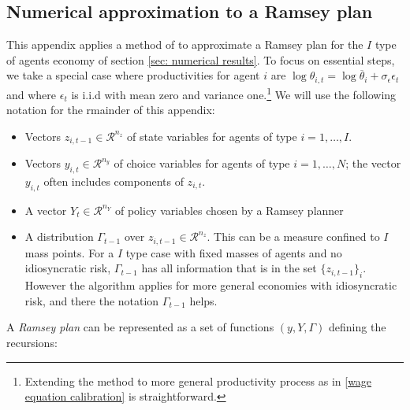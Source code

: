 \documentclass[thmsb,11pt]{article}
\begin{document}
\subsection{Numerical approximation to a Ramsey plan}\label{appndx: numerical appendix}
This appendix applies a method of \cite{Evans2014} to approximate a Ramsey plan for the $I$ type of agents economy of section \ref{sec: numerical results}. To focus on essential steps, we take a special case where productivities
for agent $i$ are $\log \theta_{i,t}=\log \overline{\theta}_i+\sigma_{\epsilon} \epsilon_t$ and where $\epsilon_t$ is i.i.d with mean zero and variance one.\footnote{Extending the method to more general productivity process as in \eqref{wage equation calibration} is straightforward.}
We will use the following notation for the rmainder of this appendix:

\begin{itemize}

\item Vectors $z_{i,{t-1}} \in \mathcal{R}^{n_z}$ of state variables for agents of type  $i =1, \ldots, I$.
\item Vectors $y_{i,t} \in \mathcal{R}^{n_y}$ of choice variables for agents of type $i =1, \ldots, N$; the vector $y_{i,t}$ often includes components of $z_{i,t}$.
\item A vector $Y_t \in \mathcal{R}^{n_Y}$ of   policy variables chosen by a Ramsey planner
\item A distribution $\Gamma_{t-1}$ over $z_{i,t-1}\in \mathcal{R}^{n_z}$. This can be a measure confined to $I$ mass points. For a $I$ type case with fixed masses of agents and no idiosyncratic risk, $\Gamma_{t-1}$ has all information that is in the set $\{z_{i,t-1}\}_i$. However the algorithm applies for more general economies with idiosyncratic risk, and there the notation $\Gamma_{t-1}$  helps.

\end{itemize}

\noindent A {\em Ramsey plan} can be represented as a set of functions $\left(y,Y,\Gamma\right)$ defining the recursions:
\end{document}
